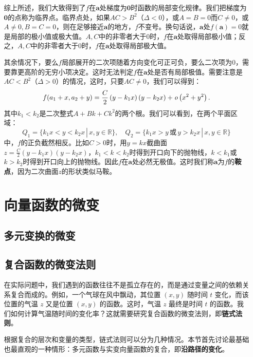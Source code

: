\documentclass[12pt,UTF8]{ctexbook}
\begin{document}
综上所述，我们大致得到了$f$在$\mathbf{a}$处梯度为$\mathbf{0}$时函数的局部变化规律。我们把梯度为$\mathbf{0}$的点称为临界点。临界点处，如果$AC > B^2$（$\Delta < 0$），或$A=B=0$而$C\neq 0$，或$A\neq 0,B=C=0$，则在足够接近$\mathbf{a}$的地方，$f$不变号。换句话说，$\mathbf{a}$处$f(\mathbf{a}) = 0$就是局部的极小值或极大值。$A,C$中的非零者大于$0$时，$f$在$\mathbf{a}$处取得局部极小值；反之，$A,C$中的非零者大于$0$时，$f$在$\mathbf{a}$处取得局部极大值。

其余情况下，要么$f$局部展开的二次项随着方向变化可正可负，要么二次项为$0$，需要靠更高阶的无穷小项决定。这时无法判定$f$在$\mathbf{a}$处是否有局部极值。需要注意是$AC<B^2$（$\Delta > 0$）的情况，这时，只要$AC\neq 0$，我们可以得到：
$$ f(a_1+x,a_2+y) = \frac{C}{2}\left(y - k_1x\right)(y - k_2x) + \mathit{o}\left(x^2+y^2\right). $$
其中$k_1<k_2$是二次整式$A + Bk + Ck^2$的两个根。我们可以看到，在两个平面区域：
$$ Q_1 = \{k_1x<y<k_2x\,|\,x,y\in\mathbb{R}\}, \quad Q_2 = \{k_1x>y\,\text{或}\,y>k_2x\,|\,x,y\in\mathbb{R}\} $$
中，$f$的正负截然相反。比如$C>0$时，用$y=kx$截曲面$z = \frac{C}{2}\left(y - k_1x\right)(y - k_2x)$，$k_1<k<k_2$时得到开口向下的抛物线，$k<k_1$或$k>k_2$时得到开口向上的抛物线。因此$f$在$\mathbf{a}$处必然无极值。这时我们称$\mathbf{a}$为$f$的\textbf{鞍点}，因为二次曲面$z$的形状类似马鞍。

\chapter{向量函数的微变}

\section{多元变换的微变}

\section{复合函数的微变法则}

在实际问题中，我们遇到的函数往往不是孤立存在的，而是通过变量之间的依赖关系复合而成的。例如，一个气球在风中飘动，其位置 $(x, y)$ 随时间 $t$ 变化，而该位置的气温 $z$ 又是位置 $(x, y)$ 的函数。这时，气温 $z$ 最终是时间 $t$ 的函数。我们如何计算气温随时间的变化率？这就需要研究复合函数的微变法则，即\textbf{链式法则}。

根据复合的层次和变量的类型，链式法则可以分为几种情况。本节首先讨论最基础也最直观的一种情形：多元函数与实变向量函数的复合，即\textbf{沿路径的变化}。
\end{document}
